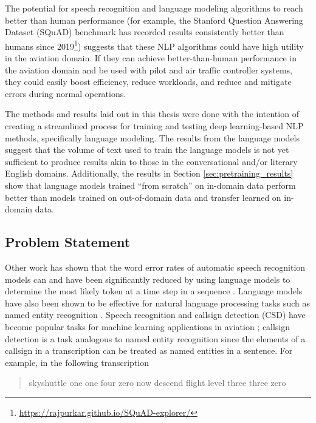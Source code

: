 \documentclass[12pt]{article}
\begin{document}
The potential for speech recognition and language modeling algorithms to reach better than human performance (for example, the Stanford Question
Answering Dataset (SQuAD) benchmark has recorded results consistently better than humans since
2019\footnote{\url{https://rajpurkar.github.io/SQuAD-explorer/}}) \cite{zhang_ai_2022} suggests that these NLP algorithms could have high utility in the
aviation domain. If they can achieve better-than-human performance in the aviation domain and be used with pilot and air traffic controller systems,
they could easily boost efficiency, reduce workloads, and reduce and mitigate errors during normal operations.

The methods and results laid out in this thesis were done with the intention of creating a streamlined process for training and testing deep
learning-based NLP methods, specifically language modeling. The results from the language models suggest that the volume of text used to train the
language models is not yet sufficient to produce results akin to those in the conversational and/or literary English domains. Additionally, the
results in Section \ref{sec:pretraining_results} show that language models trained ``from scratch'' on in-domain data perform better than models
trained on out-of-domain data and transfer learned on in-domain data.

\subsection{Problem Statement}\label{sec:problem_statement}
Other work has shown that the word error rates of automatic speech recognition models can and have been significantly reduced by using language models
to determine the most likely token at a time step in a sequence \cite{li_jasper_2019,kriman_quartznet_2020}. Language models have also been shown to
be effective for natural language processing tasks such as named entity recognition \cite{devlin_bert_2019,liu_roberta_2019}. Speech recognition and
callsign detection (CSD) have become popular tasks for machine learning applications in aviation
\cite{pellegrini_airbus_2019,delpech_real-life_2018,helmke_quantifying_2017}; callsign detection is a task analogous to named entity recognition since
the elements of a callsign in a transcription can be treated as named entities in a sentence. For example, in the following transcription

\begin{quote}
    skyshuttle one one four zero now descend flight level three three zero
\end{quote}
\end{document}
